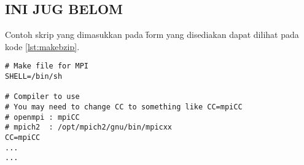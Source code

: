 \subsection{INI JUG BELOM}
Contoh skrip yang dimasukkan pada \f{form} yang disediakan dapat dilihat pada kode \ref{lst:makebzip}.
\begin{lstlisting}[caption={Potongan \co{Makefile} \f{project}}, label={lst:makebzip},style=shell]
# Make file for MPI
SHELL=/bin/sh

# Compiler to use
# You may need to change CC to something like CC=mpiCC
# openmpi : mpiCC
# mpich2  : /opt/mpich2/gnu/bin/mpicxx
CC=mpiCC
...
...
\end{lstlisting}